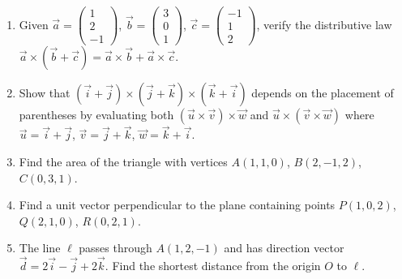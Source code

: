 \documentclass[11pt]{article}
\begin{document}
\begin{exercice}
\begin{enumerate}
    \item Given $\vec{a} = \begin{pmatrix}1\\2\\-1\end{pmatrix}$, $\vec{b} = \begin{pmatrix}3\\0\\1\end{pmatrix}$, $\vec{c} = \begin{pmatrix}-1\\1\\2\end{pmatrix}$, verify the distributive law $\vec{a} \times (\vec{b}+\vec{c}) = \vec{a}\times\vec{b} + \vec{a}\times\vec{c}$.
    \item Show that $(\vec{i}+\vec{j}) \times (\vec{j}+\vec{k}) \times (\vec{k}+\vec{i})$ depends on the placement of parentheses by evaluating both $(\vec{u}\times\vec{v})\times\vec{w}$ and $\vec{u}\times(\vec{v}\times\vec{w})$ where $\vec{u}=\vec{i}+\vec{j}$, $\vec{v}=\vec{j}+\vec{k}$, $\vec{w}=\vec{k}+\vec{i}$.
    \item Find the area of the triangle with vertices $A(1,1,0)$, $B(2,-1,2)$, $C(0,3,1)$.
    \item Find a unit vector perpendicular to the plane containing points $P(1,0,2)$, $Q(2,1,0)$, $R(0,2,1)$.
    \item The line $\ell$ passes through $A(1,2,-1)$ and has direction vector $\vec{d} = 2\vec{i} - \vec{j} + 2\vec{k}$. Find the shortest distance from the origin $O$ to $\ell$.
\end{enumerate}
\end{exercice}
\end{document}
